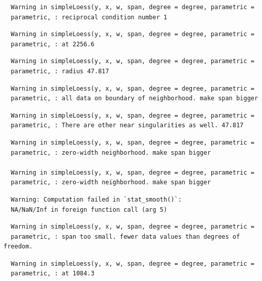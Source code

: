 \documentclass[12pt,twoside]{reedthesis}
\begin{document}
  \begin{verbatim}
  Warning in simpleLoess(y, x, w, span, degree = degree, parametric =
  parametric, : reciprocal condition number 1
  \end{verbatim}
  
  \begin{verbatim}
  Warning in simpleLoess(y, x, w, span, degree = degree, parametric =
  parametric, : at 2256.6
  \end{verbatim}
  
  \begin{verbatim}
  Warning in simpleLoess(y, x, w, span, degree = degree, parametric =
  parametric, : radius 47.817
  \end{verbatim}
  
  \begin{verbatim}
  Warning in simpleLoess(y, x, w, span, degree = degree, parametric =
  parametric, : all data on boundary of neighborhood. make span bigger
  \end{verbatim}
  
  \begin{verbatim}
  Warning in simpleLoess(y, x, w, span, degree = degree, parametric =
  parametric, : There are other near singularities as well. 47.817
  \end{verbatim}
  
  \begin{verbatim}
  Warning in simpleLoess(y, x, w, span, degree = degree, parametric =
  parametric, : zero-width neighborhood. make span bigger
  
  Warning in simpleLoess(y, x, w, span, degree = degree, parametric =
  parametric, : zero-width neighborhood. make span bigger
  \end{verbatim}
  
  \begin{verbatim}
  Warning: Computation failed in `stat_smooth()`:
  NA/NaN/Inf in foreign function call (arg 5)
  \end{verbatim}
  
  \begin{verbatim}
  Warning in simpleLoess(y, x, w, span, degree = degree, parametric =
  parametric, : span too small. fewer data values than degrees of freedom.
  \end{verbatim}
  
  \begin{verbatim}
  Warning in simpleLoess(y, x, w, span, degree = degree, parametric =
  parametric, : at 1084.3
  \end{verbatim}
  
\end{document}
